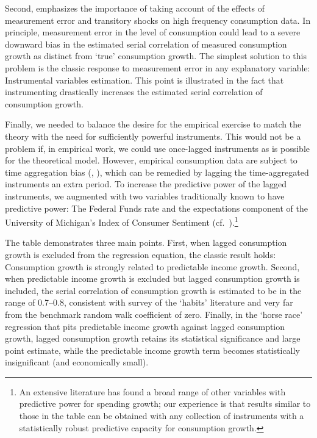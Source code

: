 \documentclass[titlepage]{\econtex}\newcommand{\texname}{cAndCwithStickyE}
\begin{document}
Second, \cite{som07} emphasizes the importance of taking account of the effects of measurement error and transitory shocks on high frequency consumption data.  In principle, measurement error in the level of consumption could lead to a severe downward bias in the estimated serial correlation of measured consumption growth as distinct from `true' consumption growth.  The simplest solution to this problem is the classic response to measurement error in any explanatory variable: Instrumental variables estimation.  This point is illustrated in the fact that instrumenting drastically increases the estimated serial correlation of consumption growth.

Finally, we needed to balance the desire for the empirical exercise to match the theory with the need for sufficiently powerful instruments.  This would not be a problem if, in empirical work, we could use once-lagged instruments as is possible for the theoretical model.  However, empirical consumption data are subject to time aggregation bias (\cite{workingTimeAgg}, \cite{cmModel}), which can be remedied by lagging the time-aggregated instruments an extra period.  To increase the predictive power of the lagged instruments, we augmented with two variables traditionally known to have predictive power: The Federal Funds rate and the expectations component of the University of Michigan's Index of Consumer Sentiment (cf.\ \cite{cfwSentiment}).\footnote{An extensive literature has found a broad range of other variables with predictive power for spending growth; our experience is that results similar to those in the table can be obtained with any collection of instruments with a statistically robust predictive capacity for consumption growth.}

The table demonstrates three main points.  First, when lagged consumption growth is excluded from the regression equation, the classic \cite{cmModel} result holds: Consumption growth is strongly related to predictable income growth.  Second, when predictable income growth is excluded but lagged consumption growth is included, the serial correlation of consumption growth is estimated to be in the range of 0.7--0.8, consistent with \cite{hrsHabit} survey of the `habits' literature and very far from the benchmark random walk coefficient of zero.  Finally, in the `horse race' regression that pits predictable income growth against lagged consumption growth, lagged consumption growth retains its statistical significance and large point estimate, while the predictable income growth term becomes statistically insignificant (and economically small).
\end{document}
